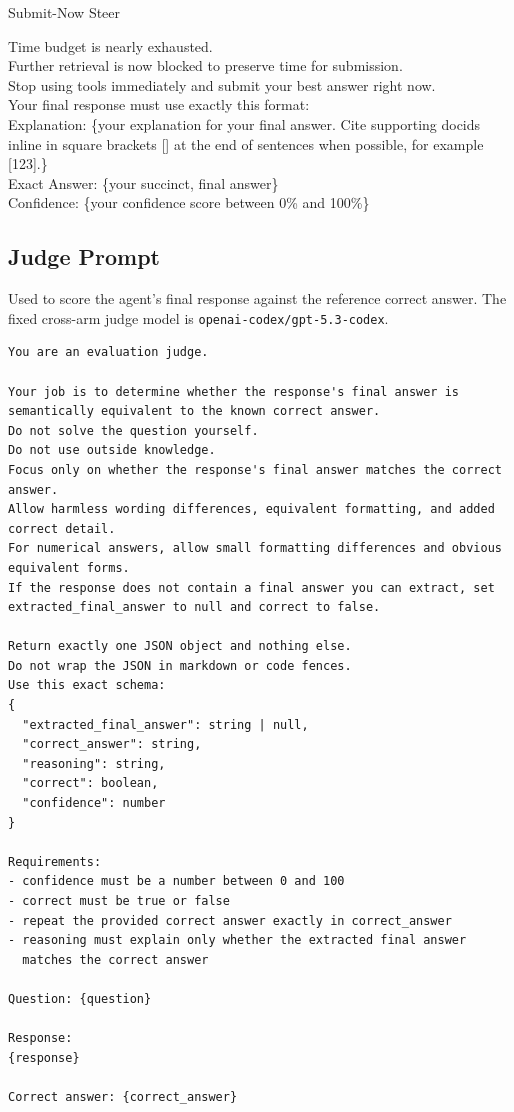 \begin{promptbox}{Submit-Now Steer}
\ttfamily\footnotesize\raggedright
Time budget is nearly exhausted.
\\
Further retrieval is now blocked to preserve time for submission.
\\
Stop using tools immediately and submit your best answer right now.
\\
Your final response must use exactly this format:
\\
Explanation: \{your explanation for your final answer. Cite supporting docids inline in square brackets [] at the end of sentences when possible, for example [123].\}
\\
Exact Answer: \{your succinct, final answer\}
\\
Confidence: \{your confidence score between 0\% and 100\%\}
\end{promptbox}

\subsection{Judge Prompt}
\label{prompt:judge}

Used to score the agent's final response against the reference correct
answer.  The fixed cross-arm judge model is
{\tt openai-codex/gpt-5.3-codex}.

\begin{verbatim}
You are an evaluation judge.

Your job is to determine whether the response's final answer is
semantically equivalent to the known correct answer.
Do not solve the question yourself.
Do not use outside knowledge.
Focus only on whether the response's final answer matches the correct
answer.
Allow harmless wording differences, equivalent formatting, and added
correct detail.
For numerical answers, allow small formatting differences and obvious
equivalent forms.
If the response does not contain a final answer you can extract, set
extracted_final_answer to null and correct to false.

Return exactly one JSON object and nothing else.
Do not wrap the JSON in markdown or code fences.
Use this exact schema:
{
  "extracted_final_answer": string | null,
  "correct_answer": string,
  "reasoning": string,
  "correct": boolean,
  "confidence": number
}

Requirements:
- confidence must be a number between 0 and 100
- correct must be true or false
- repeat the provided correct answer exactly in correct_answer
- reasoning must explain only whether the extracted final answer
  matches the correct answer

Question: {question}

Response:
{response}

Correct answer: {correct_answer}
\end{verbatim}


